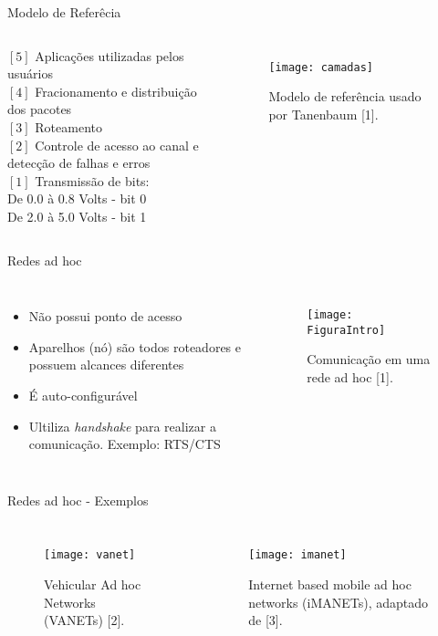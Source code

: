 \begin{frame}{Modelo de Referêcia}
  \begin{columns}
     $[5]$ Aplicações utilizadas pelos usuários \\
     $[4]$ Fracionamento e distribuição dos pacotes \\
     $[3]$ Roteamento \\
     $[2]$ Controle de acesso ao canal e detecção de falhas e erros \\
     $[1]$ Transmissão de bits: \\ 
     \hspace{35pt} De 0.0 à 0.8 Volts - bit 0 \\
     \hspace{35pt} De 2.0 à 5.0 Volts - bit 1
    \begin{figure}
      \texttt{[image: camadas]}
      \caption{Modelo de referência usado por Tanenbaum [1].}
      \label{fig:camadas}
    \end{figure}
  \end{columns}
\end{frame}

\begin{frame}{Redes ad hoc}
 \begin{columns}
    \begin{itemize}
    \item Não possui ponto de acesso
    \item Aparelhos (nó) são todos roteadores e possuem alcances diferentes
    \item É auto-configurável
    \item Ultiliza \textit{handshake} para realizar a comunicação. Exemplo: RTS/CTS
    \end{itemize}

    \begin{figure}
      \texttt{[image: FiguraIntro]}
      \caption{Comunicação em uma rede ad hoc [1].}
      \label{fig:FiguraIntro}
    \end{figure}
  \end{columns}
\end{frame}


\begin{frame}{Redes ad hoc - Exemplos}
   \begin{columns}
    \begin{figure}
      \texttt{[image: vanet]}
      \caption{Vehicular Ad hoc Networks (VANETs) [2].}
      \label{fig:vanet}
    \end{figure}

    \begin{figure}
      \texttt{[image: imanet]}
      \caption{Internet based mobile ad hoc networks (iMANETs), adaptado de [3].}
      \label{fig:imanet}
    \end{figure}
  \end{columns}

\end{frame}


